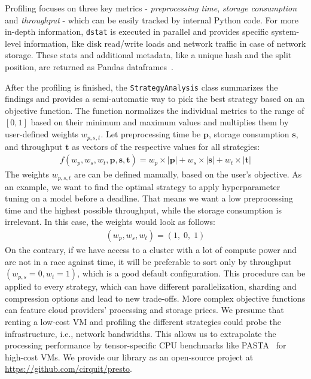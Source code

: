 Profiling focuses on three key metrics - \textit{preprocessing time}, \textit{storage consumption} and \textit{throughput} - which can be easily tracked by internal Python code.
For more in-depth information, \texttt{dstat} is executed in parallel and provides specific system-level information, like disk read/write loads and network traffic in case of network storage.
These stats and additional metadata, like a unique hash and the split position, are returned as Pandas dataframes~\cite{mckinney-proc-scipy-2010}.

After the profiling is finished, the \texttt{StrategyAnalysis} class summarizes the findings and provides a semi-automatic way to pick the best strategy based on {\color{diff}an objective function.}
The function normalizes the individual metrics to the range of $[0, 1]$ based on their minimum and maximum values and multiplies them by user-defined weights $w_{p, s, t}$.
Let preprocessing time be $\textbf{p}$, storage consumption $\textbf{s}$, and throughput $\textbf{t}$ as vectors of the respective values for all strategies:
\begin{align*}
    f(w_p, w_s, w_t, \textbf{p}, \textbf{s}, \textbf{t}) = w_p \times |\textbf{p}| + w_s \times |\textbf{s}| + w_t \times |\textbf{t}|
\end{align*}
{\color{diff}
The weights $w_{p, s, t}$ are can be defined manually, based on the user's objective.}
As an example, we want to find the optimal strategy to apply hyperparameter tuning on a model before a deadline.
That means we want a low preprocessing time and the highest possible throughput, while the storage consumption is irrelevant. In this case, the weights would look as follows:
\begin{align*}
(w_p, w_s, w_t) = (1,\; 0,\; 1)
\end{align*}
{\color{diff}
On the contrary, if we have access to a cluster with a lot of compute power and are not in a race against time, it will be preferable to sort only by throughput $(w_{p,s} = 0, w_t = 1)$, which is a good default configuration.}
{\color{diff}This procedure can be applied to every strategy, which can have different parallelization, sharding and compression options and lead to new trade-offs.}
{\color{diff}More complex objective functions} can feature cloud providers' processing and storage prices.
We presume that renting a low-cost VM and profiling the different strategies could probe the infrastructure, i.e., network bandwidths.
This allows us to extrapolate the processing performance by tensor-specific CPU benchmarks like PASTA~\cite{li2020parallel} for high-cost VMs.
We provide our library as an open-source project at \href{https://github.com/cirquit/presto}{https://github.com/cirquit/presto}.

